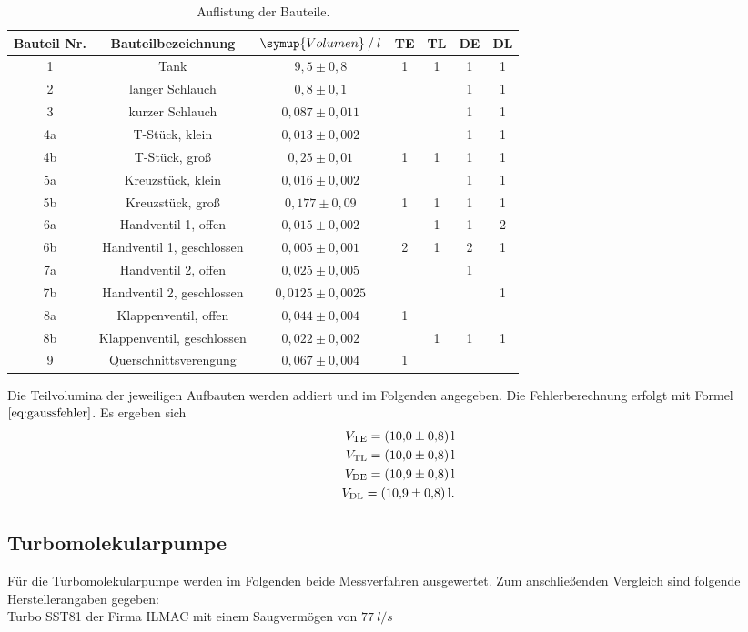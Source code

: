 \begin{table}[!hht]
	\centering
	\begin{tabular}{|c|c|c|c|c|c|c|}
		\hline
		Bauteil Nr. & Bauteilbezeichnung & {$\symup{Volumen} \:/\: l$}& TE & TL & DE & DL\\ \hline
		1	&	Tank & $9,5 \pm 0,8$ & 1 & 1 & 1 & 1 \\ \hline
		2	&	langer Schlauch & $0,8 \pm 0,1$ &  &  & 1 & 1 \\	\hline
		3	&	kurzer Schlauch & $0,087 \pm 0,011$ &  &  & 1 & 1 \\	\hline
		4a	&	T-Stück, klein & $0,013 \pm 0,002$ &  &  & 1 & 1 \\	\hline
		4b	&	T-Stück, groß & $0,25 \pm 0,01$ & 1 & 1 & 1 & 1 \\	\hline
		5a	&	Kreuzstück, klein & $0,016 \pm 0,002$ &  &  & 1 & 1 \\	\hline
		5b	&	Kreuzstück, groß & $0,177 \pm 0,09$ & 1 & 1 & 1 & 1 \\	\hline
		6a	&	Handventil 1, offen & $0,015 \pm 0,002$ &  & 1 & 1 & 2 \\	\hline
		6b	&	Handventil 1, geschlossen & $0,005 \pm 0,001$ &  2 & 1 & 2 & 1 \\	\hline
		7a	&	Handventil 2, offen & $0,025 \pm 0,005$ &  &  & 1 &  \\	\hline
		7b	&	Handventil 2, geschlossen & $0,0125 \pm 0,0025$ &  &  &  & 1 \\	\hline
		8a	&	Klappenventil, offen & $0,044 \pm 0,004$ & 1 &  &  &  \\	\hline
		8b	&	Klappenventil, geschlossen & $0,022 \pm 0,002$ &  & 1 & 1 & 1 \\	\hline
		9	&	Querschnittsverengung & $0,067 \pm 0,004$ & 1 &  &  &  \\	\hline
	\end{tabular}
	\caption{Auflistung der Bauteile.\cite{anleitung}}
	\label{tab:Bauteile}
\end{table}
Die Teilvolumina der jeweiligen Aufbauten werden addiert und im Folgenden angegeben. Die Fehlerberechnung erfolgt mit Formel $\ref{eq:gaussfehler}$.
Es ergeben sich
\begin{align*}
   V_\text{TE}=\SI{10,0 \pm 0,8}{l}\\
   V_\text{TL}=\SI{10,0 \pm 0,8}{l}\\
   V_\text{DE}=\SI{10,9 \pm 0,8}{l}\\
   V_\text{DL}=\SI{10,9 \pm 0,8}{l}.
\end{align*}

\subsection{Turbomolekularpumpe}
Für die Turbomolekularpumpe werden im Folgenden beide Messverfahren ausgewertet.
Zum anschließenden Vergleich sind folgende Herstellerangaben gegeben:\\
Turbo SST81 der Firma ILMAC mit einem Saugvermögen von $\SI{77}{l/s}$

